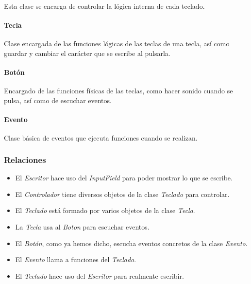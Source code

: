Esta clase se encarga de controlar la lógica interna de cada teclado.

\paragraph{\qquad Tecla} 
\hfill \break %

Clase encargada de las funciones lógicas de las teclas de una tecla, así como guardar y cambiar el carácter que se escribe al pulsarla.

\paragraph{\qquad Botón} 
\hfill \break %

Encargado de las funciones físicas de las teclas, como hacer sonido cuando se pulsa, así como de escuchar eventos.

\paragraph{\qquad Evento} 
\hfill \break %

Clase básica de eventos que ejecuta funciones cuando se realizan.

\subsubsection{Relaciones}

\begin{itemize}
	\item El \textit{Escritor} hace uso del \textit{InputField} para poder mostrar lo que se escribe.
	\item El \textit{Controlador} tiene diversos objetos de la clase \textit{Teclado} para controlar.
	\item El \textit{Teclado} está formado por varios objetos de la clase \textit{Tecla}.
	\item La \textit{Tecla} usa al \textit{Boton} para escuchar eventos.
	\item El \textit{Botón}, como ya hemos dicho, escucha eventos concretos de la clase \textit{Evento}.
	\item El \textit{Evento} llama a funciones del \textit{Teclado}.
	\item El \textit{Teclado} hace uso del \textit{Escritor} para realmente escribir.
\end{itemize}

